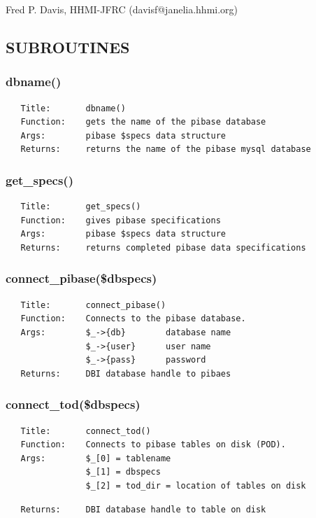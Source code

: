 \documentclass{article}
\begin{document}
Fred P. Davis, HHMI-JFRC (davisf@janelia.hhmi.org)

\subsection*{SUBROUTINES\label{pibase_pm_SUBROUTINES}}
\subsubsection*{dbname()\label{pibase_pm_dbname_}}
\begin{verbatim}
   Title:       dbname()
   Function:    gets the name of the pibase database
   Args:        pibase $specs data structure
   Returns:     returns the name of the pibase mysql database
\end{verbatim}
\subsubsection*{get\_specs()\label{pibase_pm_get_specs_}}
\begin{verbatim}
   Title:       get_specs()
   Function:    gives pibase specifications
   Args:        pibase $specs data structure
   Returns:     returns completed pibase data specifications
\end{verbatim}
\subsubsection*{connect\_pibase(\$dbspecs)\label{pibase_pm_connect_pibase_dbspecs_}}
\begin{verbatim}
   Title:       connect_pibase()
   Function:    Connects to the pibase database.
   Args:        $_->{db}        database name
                $_->{user}      user name
                $_->{pass}      password
   Returns:     DBI database handle to pibaes
\end{verbatim}
\subsubsection*{connect\_tod(\$dbspecs)\label{pibase_pm_connect_tod_dbspecs_}}
\begin{verbatim}
   Title:       connect_tod()
   Function:    Connects to pibase tables on disk (POD).
   Args:        $_[0] = tablename
                $_[1] = dbspecs
                $_[2] = tod_dir = location of tables on disk
\end{verbatim}
\begin{verbatim}
   Returns:     DBI database handle to table on disk
\end{verbatim}
\end{document}
